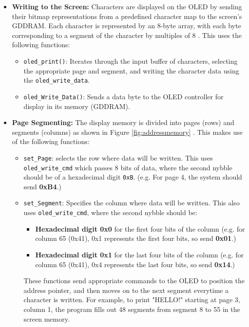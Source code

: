 \begin{itemize}
    \item \textbf{Writing to the Screen:} Characters are displayed on the OLED by sending their bitmap representations from a predefined character map to the screen's GDDRAM. Each character is represented by an 8-byte array, with each byte corresponding to a segment of the character by multiples of 8 \cite{interfacex}. This uses the following functions: 
        \begin{itemize}
            \item \texttt{oled\_print()}: Iterates through the input buffer of characters, selecting the appropriate page and segment, and writing the character data using the \texttt{oled\_write\_data}.
            \item \texttt{oled\_Write\_Data()}: Sends a data byte to the OLED controller for display in its memory (GDDRAM).
        \end{itemize}
    \item \textbf{Page Segmenting:} The display memory is divided into pages (rows) and segments (columns) as shown in Figure \ref{fig:addressmemory} \cite{SSD1306_Datasheet}. This makes use of the following functions:
        \begin{itemize}
            \item \texttt{set\_Page}: selects the row where data will be written. This uses \texttt{oled\_write\_cmd} which passes 8 bits of data, where the second nybble should be of a hexadecimal digit \texttt{0xB}. (e.g. For page 4, the system should send \textbf{0xB4}.)
            \item \texttt{set\_Segment}: Specifies the column where data will be written. This also uses \texttt{oled\_write\_cmd}, where the second nybble should be: 
            \begin{itemize}
                \item \textbf{Hexadecimal digit 0x0} for the first four bits of the column (e.g. for column 65 (0x41), 0x1 represents the first four bits, so send \textbf{0x01}.)
                \item \textbf{Hexadecimal digit 0x1} for the last four bits of the column (e.g. for column 65 (0x41), 0x4 represents the last four bits, so send \textbf{0x14}.)
            \end{itemize}

            These functions send appropriate commands to the OLED to position the address pointer, and then moves on to the next segment everytime a character is written. For example, to print "HELLO!" starting at page 3, column 1, the program fills out 48 segments from segment 8 to 55 in the screen memory.


\end{itemize}
\end{itemize}
